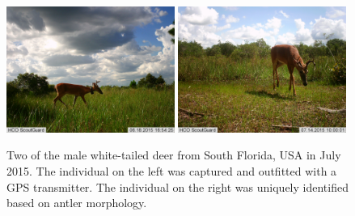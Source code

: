\documentclass[12pt]{article}
\begin{document}
\clearpage


\begin{figure}[h!]
  \centering
  \includegraphics[width=0.49\textwidth, trim = 0mm 10mm 0mm 0mm, clip]{figs/buck_collar_6in} 
  \includegraphics[width=0.49\textwidth, trim = 0mm 10mm 0mm 0mm, clip]{figs/buck_no_collar_6in} \\
  \caption{Two of the male white-tailed deer from South Florida, USA
    in July 2015. The individual on the left was captured and
    outfitted with a GPS transmitter. The individual on the right was
    uniquely identified based on antler morphology.} 
  \label{fig:bucks}
\end{figure}



\clearpage
\end{document}
